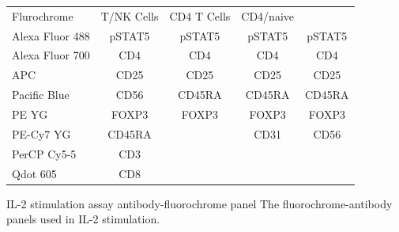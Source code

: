 

\begin{table}[h!]\footnotesize
  \centering
\begin{tabularx}{\textwidth}{lcccc}
\rowcolor{Gray}
Flurochrome     & T/NK Cells & CD4 T Cells & CD4/naive \\
Alexa Fluor 488 & pSTAT5 & pSTAT5 & pSTAT5 & pSTAT5  \\
Alexa Fluor 700 & CD4    & CD4    & CD4    & CD4     \\
APC             & CD25   & CD25   & CD25   & CD25    \\
Pacific Blue    & CD56   & CD45RA & CD45RA & CD45RA  \\
PE YG           & FOXP3  & FOXP3  & FOXP3  & FOXP3   \\
PE-Cy7 YG       & CD45RA &        & CD31   & CD56    \\
PerCP Cy5-5     & CD3    &        &        &         \\
Qdot 605        & CD8    &        &        &         \\
\end{tabularx}
{IL-2 stimulation assay antibody-fluorochrome panel}
{
The fluorochrome-antibody panels used in IL-2 stimulation.
}
\end{table}



